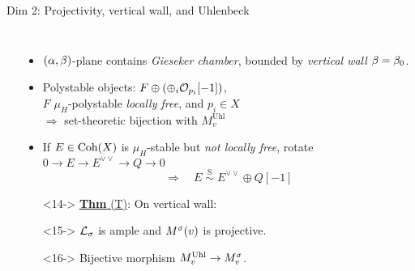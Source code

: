 \documentclass[8pt,handout]{beamer} %
\begin{document}
\begin{frame}[fragile]{Dim 2: Projectivity, vertical wall, and Uhlenbeck}
\begin{columns}[t]
\begin{itemize}
\begin{center}
        \end{center}
        \end{itemize}
                
        \begin{itemize}
            \item<10-> $(\alpha,\beta)$-plane contains \textit{Gieseker chamber}, bounded by \textit{vertical wall} $\beta = \beta_0$.
            \item<12-> Polystable objects: $F \oplus (\oplus_i \mathcal{O}_{p_i}[-1])$, \\ $F$ $\mu_H$-polystable \textit{locally free}, and $p_i \in X$ \\ $\Rightarrow$ set-theoretic bijection with $M^{\text{Uhl}}_v$
            \item<13-> If $E \in \mathrm{Coh}(X)$ is $\mu_H$-stable but \textit{not locally free}, rotate $0 \to E \to E^{\vee\vee} \to Q \to 0$
            \[ \Rightarrow \quad E \; \overset{\text{S}}{\sim} \; E^{\vee\vee} \oplus Q[-1] \]
            \item[]<14-> \underline{\textbf{Thm} (T)}: On vertical wall:
                \item[]<15-> $\mathcal{L}_\sigma$ is ample and $M^\sigma(v)$ is projective.
                \item[]<16-> Bijective morphism $M^{\text{Uhl}}_v \to M^\sigma_v$.
            

\end{itemize}
\end{columns}
\end{frame}
\end{document}
